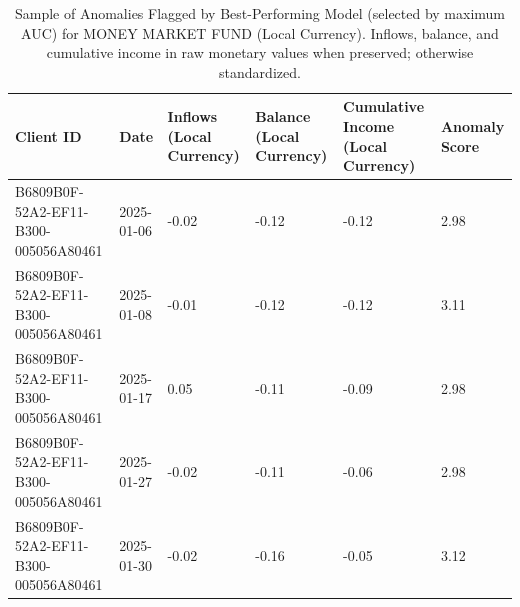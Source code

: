 \documentclass[11pt]{article}
\begin{document}
\begin{table}[h]

\centering

\caption{Sample of Anomalies Flagged by Best-Performing Model (selected by maximum AUC) for MONEY MARKET FUND (Local Currency). Inflows, balance, and cumulative income in raw monetary values when preserved; otherwise standardized.}

\begin{tabular}{llllll}

\hline

Client ID & Date & Inflows (Local Currency) & Balance (Local Currency) & Cumulative Income (Local Currency) & Anomaly Score \\

\hline

B6809B0F-52A2-EF11-B300-005056A80461 & 2025-01-06 & -0.02 & -0.12 & -0.12 & 2.98 \\

B6809B0F-52A2-EF11-B300-005056A80461 & 2025-01-08 & -0.01 & -0.12 & -0.12 & 3.11 \\

B6809B0F-52A2-EF11-B300-005056A80461 & 2025-01-17 & 0.05 & -0.11 & -0.09 & 2.98 \\

B6809B0F-52A2-EF11-B300-005056A80461 & 2025-01-27 & -0.02 & -0.11 & -0.06 & 2.98 \\

B6809B0F-52A2-EF11-B300-005056A80461 & 2025-01-30 & -0.02 & -0.16 & -0.05 & 3.12 \\

\hline

\end{tabular}

\end{table}
\end{document}
